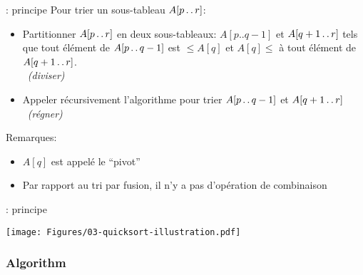 \begin{frame}{: principe}
Pour trier un sous-tableau $A[p\mathinner{\ldotp\ldotp} r]$:
\begin{itemize}
\item Partitionner $A[p\mathinner{\ldotp\ldotp} r]$ en deux sous-tableaux: $A[p..q-1]$ et $A[q+1\mathinner{\ldotp\ldotp} r]$ tels que tout élément de $A[p\mathinner{\ldotp\ldotp} q-1]$ est $\leq A[q]$ et $A[q]\leq$ à tout élément de $A[q+1\mathinner{\ldotp\ldotp} r]$.\\~\hfill\alert{\emph{(diviser)}}

\item Appeler récursivement l'algorithme pour trier $A[p\mathinner{\ldotp\ldotp} q-1]$ et $A[q+1\mathinner{\ldotp\ldotp} r]$\\~\hfill\alert{\emph{(régner)}}
\end{itemize}

\bigskip

Remarques:
\begin{itemize}
\item $A[q]$ est appelé le ``\alert{pivot}''
\item Par rapport au tri par fusion, il n'y a pas d'opération de combinaison
\end{itemize}

\end{frame}

\begin{frame}{: principe}

\centerline{\texttt{[image: Figures/03-quicksort-illustration.pdf]}}


\end{frame}

\begin{frame}\frametitle{ Algorithm}

  \begin{center}


  \end{center}
\end{frame}

